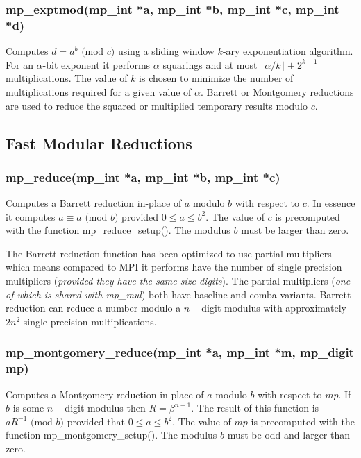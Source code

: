 \documentclass{article}
\begin{document}
\subsubsection{mp\_exptmod(mp\_int *a, mp\_int *b, mp\_int *c, mp\_int *d)}
Computes $d = a^b \mbox{ (mod }c\mbox{)}$ using a sliding window $k$-ary exponentiation algorithm.  For an $\alpha$-bit
exponent it performs $\alpha$ squarings and at most $\lfloor \alpha/k \rfloor + 2^{k-1}$ multiplications.  The value of $k$ is
chosen to minimize the number of multiplications required for a given value of $\alpha$.  Barrett or Montgomery 
reductions are used to reduce the squared or multiplied temporary results modulo $c$.

\subsection{Fast Modular Reductions}

\subsubsection{mp\_reduce(mp\_int *a, mp\_int *b, mp\_int *c)}
Computes a Barrett reduction in-place of $a$ modulo $b$ with respect to $c$.  In essence it computes 
$a \equiv a \mbox{ (mod }b\mbox{)}$ provided $0 \le a \le b^2$.  The value of $c$ is precomputed with the 
function mp\_reduce\_setup().  The modulus $b$ must be larger than zero.

The Barrett reduction function has been optimized to use partial multipliers which means compared to MPI it performs
have the number of single precision multipliers (\textit{provided they have the same size digits}).  The partial
multipliers (\textit{one of which is shared with mp\_mul}) both have baseline and comba variants.  Barrett reduction 
can reduce a number modulo a $n-$digit modulus with approximately $2n^2$ single precision multiplications.  

\subsubsection{mp\_montgomery\_reduce(mp\_int *a, mp\_int *m, mp\_digit mp)}
Computes a Montgomery reduction in-place of $a$ modulo $b$ with respect to $mp$.  If $b$ is some $n-$digit modulus then
$R = \beta^{n+1}$.  The result of this function is $aR^{-1} \mbox{ (mod }b\mbox{)}$ provided that $0 \le a \le b^2$.
The value of $mp$ is precomputed with the function mp\_montgomery\_setup().  The modulus $b$ must be odd and larger
than zero.  
\end{document}
